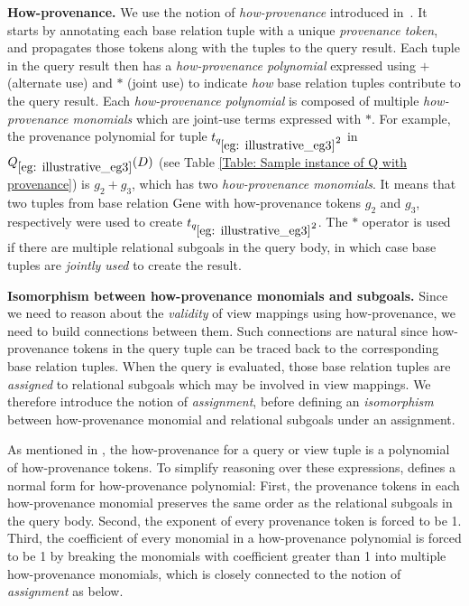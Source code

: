 \textbf{How-provenance.} We use the notion of {\em how-provenance} introduced in~\cite{green2007provenance}. It starts by annotating each base relation tuple with a unique {\em provenance token}, and propagates those tokens along with the tuples to the query result.  Each tuple in the query result then has a {\em how-provenance polynomial} expressed using $+$ (alternate use) and $*$ (joint use) to indicate {\em how} base relation tuples contribute to the query result. Each {\em how-provenance polynomial} is composed of multiple {\em how-provenance monomials} which are joint-use terms expressed with $*$. For example, the provenance polynomial for tuple $t_{q_{\ref{eg: illustrative_eg3}}2}$ in $Q_{\ref{eg: illustrative_eg3}}(D)$ (see Table \ref{Table: Sample instance of Q with provenance}) is $g_2 + g_3$, which has two \textit{how-provenance monomials}. It means that two tuples from base relation Gene with how-provenance tokens $g_2$ and $g_3$, respectively
were used to create $t_{q_{\ref{eg: illustrative_eg3}}2}$.  The $*$ operator is used if there are multiple relational subgoals in the query body, in which case base tuples are {\em jointly used} to create the result.


\textbf{Isomorphism between how-provenance monomials and subgoals.} Since we need to reason about the \textit{validity} of view mappings using how-provenance, we need to build connections between them. Such connections are natural since how-provenance tokens in the query tuple can be traced back to the corresponding base relation tuples. When the query is evaluated, those base relation tuples are {\em assigned} to relational subgoals which may be involved in view mappings.
We therefore introduce the notion of {\em assignment}, before defining an {\em isomorphism} between how-provenance monomial and relational subgoals under an assignment.

As mentioned in \cite{green2007provenance}, the how-provenance for a query or view tuple is a polynomial of how-provenance tokens. To simplify reasoning over these expressions, \cite{amsterdamer2012provenance} defines a normal form for how-provenance polynomial: First, the provenance tokens in each how-provenance monomial preserves the same order as the relational subgoals in the query body. Second, the exponent of every provenance token is forced to be 1. Third, the coefficient of every monomial in a how-provenance polynomial is forced to be 1 by breaking the monomials with coefficient greater than 1 into multiple how-provenance monomials, which is closely connected to the notion of {\em assignment} as below.

